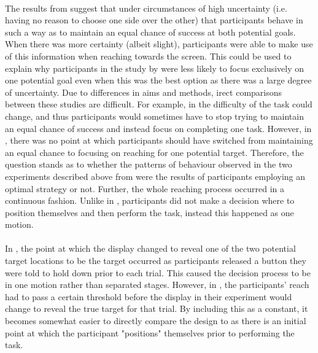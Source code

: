 \documentclass[12pt]{article}
\begin{document}
\paragraph{} The results from \cite{CHAPMAN2010168} suggest that under circumstances of high uncertainty (i.e. having no reason to choose one side over the other) that participants behave in such a way as to maintain an equal chance of success at both potential goals. When there was more certainty (albeit slight), participants were able to make use of this information when reaching towards the screen. This could be used to explain why participants in the study by \cite{clarke2015failure} were less likely to focus exclusively on one potential goal even when this was the best option as there was a large degree of uncertainty. Due to differences in aims and methods, irect comparisons between these studies are difficult. For example, in \cite{clarke2015failure} the difficulty of the task could change, and thus participants would sometimes have to stop trying to maintain an equal chance of success and instead focus on completing one task. However, in \cite{CHAPMAN2010168}, there was no point at which participants should have switched from maintaining an equal chance to focusing on reaching for one potential target. Therefore, the question stands as to whether the patterns of behaviour observed in the two experiments described above from \cite{CHAPMAN2010168} were the results of participants employing an optimal strategy or not. Further, the whole reaching process occurred in a continuous fashion. Unlike in \cite{clarke2015failure}, participants did not make a decision where to position themselves and then perform the task, instead this happened as one motion.%

\paragraph{} In \cite{CHAPMAN2010168}, the point at which the display changed to reveal one of the two potential target locations to be the target occurred as participants released a button they were told to hold down prior to each trial. This caused the decision process to be in one motion rather than separated stages. However, in \cite{Hudson2007probmove}, the participants' reach had to pass a certain threshold before the display in their experiment would change to reveal the true target for that trial. By including this as a constant, it becomes somewhat easier to directly compare the design to \cite{clarke2015failure} as there is an initial point at which the participant "positions" themselves prior to performing the task. 
\end{document}
